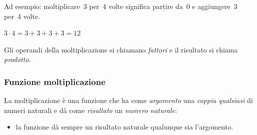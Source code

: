 Ad esempio: moltiplicare~3 per~4 volte significa partire da~0 e 
aggiungere~3 per~4 volte.

\begin{minipage}{0.80\textwidth}
 \centering
 \(3 \cdot 4 = 3 + 3 + 3 + 3 = 12\)

% 
\end{minipage}%
\begin{minipage}{0.15\textwidth}
 \centering
\begin{inaccessibleblock}[]
\end{inaccessibleblock}
\end{minipage}%

Gli operandi della moltiplicazione si chiamano \emph{fattori} e il 
risultato si chiama \emph{prodotto}.

\subsubsection{Funzione moltiplicazione}

La moltiplicazione è una funzione che ha come \emph{argomento} una 
\emph{coppia 
qualsiasi} di numeri naturali e dà come \emph{risultato} un \emph{numero 
naturale}:

\vspace{.5em}
\begin{minipage}[t]{.48\textwidth}
\begin{center}
\begin{inaccessibleblock}
\end{inaccessibleblock}
\end{center}
\end{minipage}
\hfill
\begin{minipage}[t]{.48\textwidth}
\begin{center}
\begin{inaccessibleblock}
\end{inaccessibleblock}
\end{center}
\end{minipage}

\begin{osservazione}{}{}
\begin{itemize} [nosep]
\item la funzione dà sempre un risultato naturale qualunque sia l'argomento.
\end{itemize}

\end{osservazione}

